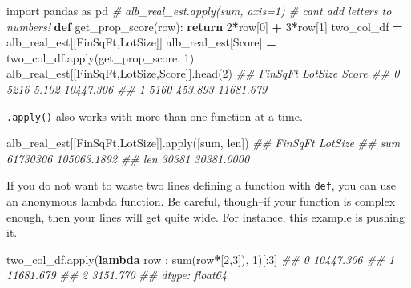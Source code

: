 \documentclass[
  12pt,
  krantz2]{krantz}
\makeatletter
\newenvironment{Shaded}{\begin{snugshade}}{\end{snugshade}}
\newcommand{\BuiltInTok}[1]{#1}
\newcommand{\CommentTok}[1]{\textcolor[rgb]{0.37,0.37,0.37}{\textit{#1}}}
\newcommand{\ControlFlowTok}[1]{\textcolor[rgb]{0.27,0.27,0.27}{\textbf{#1}}}
\newcommand{\DecValTok}[1]{\textcolor[rgb]{0.06,0.06,0.06}{#1}}
\newcommand{\ImportTok}[1]{#1}
\newcommand{\KeywordTok}[1]{\textcolor[rgb]{0.27,0.27,0.27}{\textbf{#1}}}
\newcommand{\NormalTok}[1]{#1}
\newcommand{\OperatorTok}[1]{\textcolor[rgb]{0.43,0.43,0.43}{\textbf{#1}}}
\newcommand{\StringTok}[1]{\textcolor[rgb]{0.5,0.5,0.5}{#1}}
\newenvironment{kframe}{%
\medskip{}
\setlength{\fboxsep}{.8em}
 \def\at@end@of@kframe{}%
 \ifinner\ifhmode%
  \def\at@end@of@kframe{\end{minipage}}%
  \begin{minipage}{\columnwidth}%
 \fi\fi%
 \def\FrameCommand##1{\hskip\@totalleftmargin \hskip-\fboxsep
 \colorbox{shadecolor}{##1}\hskip-\fboxsep
     \hskip-\linewidth \hskip-\@totalleftmargin \hskip\columnwidth}%
 \MakeFramed {\advance\hsize-\width
   \@totalleftmargin\z@ \linewidth\hsize
   \@setminipage}}%
 {\par\unskip\endMakeFramed%
 \at@end@of@kframe}
\renewenvironment{Shaded}{\begin{kframe}}{\end{kframe}}
\makeatother
\begin{document}
\begin{Shaded}
\begin{Highlighting}[]
\ImportTok{import}\NormalTok{ pandas }\ImportTok{as}\NormalTok{ pd}
\CommentTok{\# alb\_real\_est.apply(sum, axis=1) \# can\textquotesingle{}t add letters to numbers!}
\KeywordTok{def}\NormalTok{ get\_prop\_score(row):}
    \ControlFlowTok{return} \DecValTok{2}\OperatorTok{*}\NormalTok{row[}\DecValTok{0}\NormalTok{] }\OperatorTok{+} \DecValTok{3}\OperatorTok{*}\NormalTok{row[}\DecValTok{1}\NormalTok{]}
\NormalTok{two\_col\_df }\OperatorTok{=}\NormalTok{ alb\_real\_est[[}\StringTok{\textquotesingle{}FinSqFt\textquotesingle{}}\NormalTok{,}\StringTok{\textquotesingle{}LotSize\textquotesingle{}}\NormalTok{]]}
\NormalTok{alb\_real\_est[}\StringTok{\textquotesingle{}Score\textquotesingle{}}\NormalTok{] }\OperatorTok{=}\NormalTok{ two\_col\_df.}\BuiltInTok{apply}\NormalTok{(get\_prop\_score, }\DecValTok{1}\NormalTok{)}
\NormalTok{alb\_real\_est[[}\StringTok{\textquotesingle{}FinSqFt\textquotesingle{}}\NormalTok{,}\StringTok{\textquotesingle{}LotSize\textquotesingle{}}\NormalTok{,}\StringTok{\textquotesingle{}Score\textquotesingle{}}\NormalTok{]].head(}\DecValTok{2}\NormalTok{)}
\CommentTok{\#\#    FinSqFt  LotSize      Score}
\CommentTok{\#\# 0     5216    5.102  10447.306}
\CommentTok{\#\# 1     5160  453.893  11681.679}
\end{Highlighting}
\end{Shaded}

\texttt{.apply()} also works with more than one function at a time.

\begin{Shaded}
\begin{Highlighting}[]
\NormalTok{alb\_real\_est[[}\StringTok{\textquotesingle{}FinSqFt\textquotesingle{}}\NormalTok{,}\StringTok{\textquotesingle{}LotSize\textquotesingle{}}\NormalTok{]].}\BuiltInTok{apply}\NormalTok{([}\BuiltInTok{sum}\NormalTok{, }\BuiltInTok{len}\NormalTok{])}
\CommentTok{\#\#       FinSqFt      LotSize}
\CommentTok{\#\# sum  61730306  105063.1892}
\CommentTok{\#\# len     30381   30381.0000}
\end{Highlighting}
\end{Shaded}

If you do not want to waste two lines defining a function with \texttt{def}, you can use an anonymous lambda function. Be careful, though--if your function is complex enough, then your lines will get quite wide. For instance, this example is pushing it.

\begin{Shaded}
\begin{Highlighting}[]
\NormalTok{two\_col\_df.}\BuiltInTok{apply}\NormalTok{(}\KeywordTok{lambda}\NormalTok{ row : }\BuiltInTok{sum}\NormalTok{(row}\OperatorTok{*}\NormalTok{[}\DecValTok{2}\NormalTok{,}\DecValTok{3}\NormalTok{]), }\DecValTok{1}\NormalTok{)[:}\DecValTok{3}\NormalTok{]}
\CommentTok{\#\# 0    10447.306}
\CommentTok{\#\# 1    11681.679}
\CommentTok{\#\# 2     3151.770}
\CommentTok{\#\# dtype: float64}
\end{Highlighting}
\end{Shaded}
\end{document}
